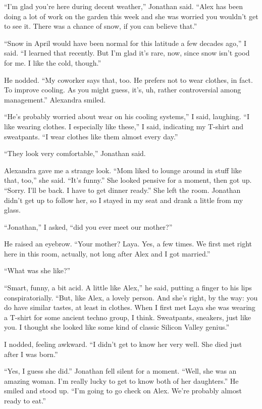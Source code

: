 \documentclass[10pt,b5paper]{article}
\begin{document}
``I'm glad you're here during decent weather,'' Jonathan said. ``Alex
has been doing a lot of work on the garden this week and she was
worried you wouldn't get to see it. There was a chance of snow,
if you can believe that.''

``Snow in April would have been normal for this latitude a few decades
ago,'' I said. ``I learned that recently.  But I'm glad it's rare,
now, since snow isn't good for me. I like the cold, though.''

He nodded. ``My coworker says that, too. He prefers not to wear
clothes, in fact. To improve cooling. As you might guess, it's, uh,
rather controversial among management.''  Alexandra smiled.

``He's probably worried about wear on his cooling systems,'' I said,
laughing. ``I like wearing clothes. I especially like these,'' I said,
indicating my T-shirt and sweatpants.  ``I wear clothes like them
almost every day.''

``They look very comfortable,'' Jonathan said.

Alexandra gave me a strange look. ``Mom liked to lounge around in
stuff like that, too,'' she said. ``It's funny.'' She looked pensive
for a moment, then got up. ``Sorry. I'll be back. I have to get dinner
ready.'' She left the room.  Jonathan didn't get up to follow her,
so I stayed in my seat and drank a little from my glass.

``Jonathan,'' I asked, ``did you ever meet our mother?''

He raised an eyebrow. ``Your mother? Laya. Yes, a few times.  We first
met right here in this room, actually, not long after Alex and I
got married.''

``What was she like?''

``Smart, funny, a bit acid. A little like Alex,'' he said, putting
a finger to his lips conspiratorially. ``But, like Alex, a lovely
person. And she's right, by the way: you do have similar tastes,
at least in clothes. When I first met Laya she was wearing a T-shirt
for some ancient techno group, I think. Sweatpants, sneakers, just
like you. I thought she looked like some kind of classic Silicon
Valley genius.''

I nodded, feeling awkward. ``I didn't get to know her very well.
She died just after I was born.''

``Yes, I guess she did.'' Jonathan fell silent for a moment.  ``Well,
she was an amazing woman. I'm really lucky to get to know both of
her daughters.''  He smiled and stood up. ``I'm going to go check on
Alex. We're probably almost ready to eat.''
\end{document}
